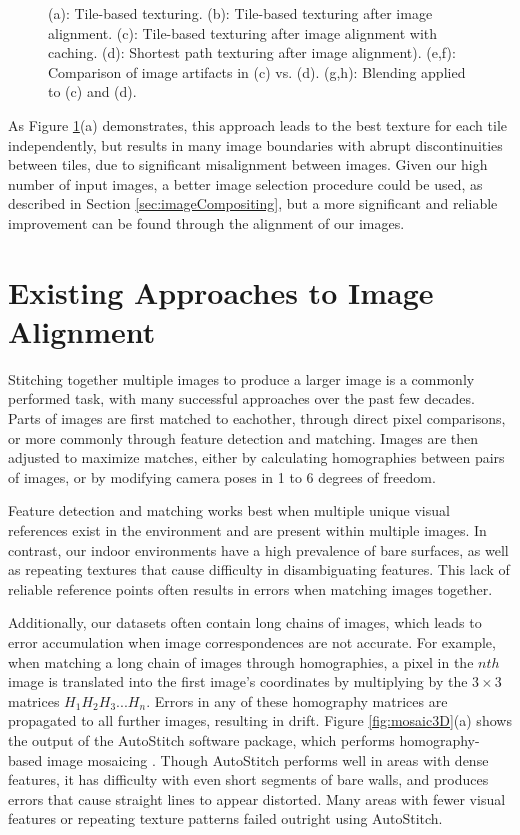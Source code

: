 \documentclass[]{spie}  %
\begin{document}
{\begin{figure}
  \caption{(a): Tile-based texturing. (b): Tile-based texturing after
    image alignment. (c): Tile-based texturing after image alignment
    with caching. (d): Shortest path texturing after image
    alignment). (e,f): Comparison of image artifacts in (c)
    vs. (d). (g,h): Blending applied to (c) and (d).}
  \label{fig:compareAll}
\end{figure}


As Figure \ref{fig:compareAll}(a) demonstrates, this approach leads to
the best texture for each tile independently, but results in many
image boundaries with abrupt discontinuities between tiles, due to
significant misalignment between images. Given our high number of
input images, a better image selection procedure could be used, as
described in Section \ref{sec:imageCompositing}, but a more
significant and reliable improvement can be found through the
alignment of our images.

\section{Existing Approaches to Image Alignment}
\label{sec:existingApproaches}
Stitching together multiple images to produce a larger image is a
commonly performed task, with many successful approaches over the past
few decades. Parts of images are first matched to eachother, through
direct pixel comparisons, or more commonly through feature detection
and matching. Images are then adjusted to maximize matches, either by
calculating homographies between pairs of images, or by modifying
camera poses in 1 to 6 degrees of freedom.

Feature detection and matching works best when multiple unique visual
references exist in the environment and are present within multiple
images. In contrast, our indoor environments have a high prevalence of
bare surfaces, as well as repeating textures that cause difficulty in
disambiguating features. This lack of reliable reference points often
results in errors when matching images together.

Additionally, our datasets often contain long chains of images, which
leads to error accumulation when image correspondences are not
accurate. For example, when matching a long chain of images through
homographies, a pixel in the $nth$ image is translated into the first
image's coordinates by multiplying by the $3\times3$ matrices $H_1 H_2
H_3 ... H_n$. Errors in any of these homography matrices are
propagated to all further images, resulting in drift. Figure
\ref{fig:mosaic3D}(a) shows the output of the AutoStitch software
package, which performs homography-based image mosaicing
\cite{autostitch}. Though AutoStitch performs well in areas with dense
features, it has difficulty with even short segments of bare walls,
and produces errors that cause straight lines to appear
distorted. Many areas with fewer visual features or repeating texture
patterns failed outright using AutoStitch.

}
\end{document}

